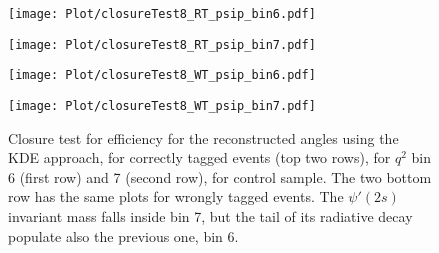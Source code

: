 \begin{figure}[hbt]
    \texttt{[image: Plot/closureTest8\_RT\_psip\_bin6.pdf]}

    \texttt{[image: Plot/closureTest8\_RT\_psip\_bin7.pdf]}

    \texttt{[image: Plot/closureTest8\_WT\_psip\_bin6.pdf]}

    \texttt{[image: Plot/closureTest8\_WT\_psip\_bin7.pdf]}

    \caption{Closure test for efficiency for the reconstructed angles
        using the KDE approach, for correctly tagged events (top two rows), for
        $q^2$ bin 6 (first row) and 7 (second row), for \BKsPsip control
        sample.
        The two bottom row has the same plots for wrongly tagged events.
        The $\psi'(2s)$ invariant mass falls inside bin 7, but the tail of its
        radiative decay populate also the previous one, bin 6.}
    \label{fig:clKDEpsip}
\end{figure}
